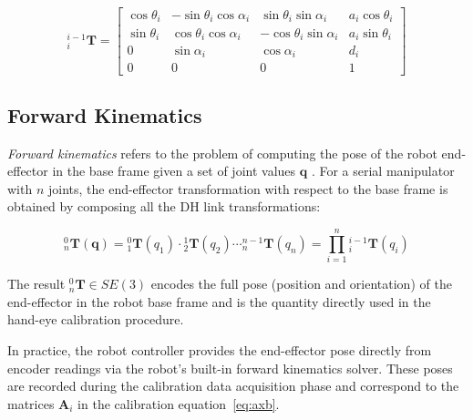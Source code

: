 \begin{equation}
    {}^{i-1}_{i}\mathbf{T} =
    \begin{bmatrix}
        \cos\theta_i & -\sin\theta_i\cos\alpha_i &  \sin\theta_i\sin\alpha_i & a_i\cos\theta_i \\
        \sin\theta_i &  \cos\theta_i\cos\alpha_i & -\cos\theta_i\sin\alpha_i & a_i\sin\theta_i \\
        0            &  \sin\alpha_i             &  \cos\alpha_i             & d_i             \\
        0            &  0                        &  0                        & 1
    \end{bmatrix}
    \label{eq:dh_matrix}
\end{equation}


\subsection{Forward Kinematics}
\label{subsec:fk}

\textit{Forward kinematics} refers to the problem of computing the pose of the
robot end-effector in the base frame given a set of joint values
$\mathbf{q}$ \cite{craig2005introduction, siciliano2009robotics}. For a
serial manipulator with $n$ joints, the end-effector transformation with respect
to the base frame is obtained by composing all the DH link transformations:

\begin{equation}
    {}^0_n\mathbf{T}(\mathbf{q}) =
    {}^0_1\mathbf{T}(q_1)\cdot
    {}^1_2\mathbf{T}(q_2) \cdots
    {}^{n-1}_n\mathbf{T}(q_n)
    = \prod_{i=1}^{n} {}^{i-1}_i\mathbf{T}(q_i)
    \label{eq:fk}
\end{equation}

\noindent The result ${}^0_n\mathbf{T} \in SE(3)$ encodes the full pose
(position and orientation) of the end-effector in the robot base frame and
is the quantity directly used in the hand-eye calibration procedure.

In practice, the robot controller provides the end-effector pose directly
from encoder readings via the robot's built-in forward kinematics solver.
These poses are recorded during the calibration data acquisition phase and
correspond to the matrices $\mathbf{A}_i$ in the calibration
equation~\eqref{eq:axb}.









